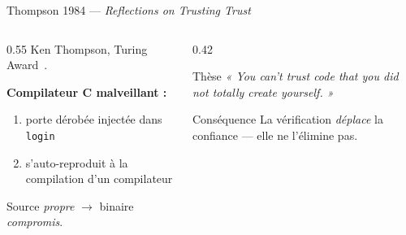\documentclass[aspectratio=169]{beamer}
\begin{document}
\begin{frame}{Thompson 1984 — \emph{Reflections on Trusting Trust}}
  \begin{columns}
    \begin{column}{0.55\textwidth}
      Ken Thompson, Turing Award~\cite{thompson1984trusting}.
      \medskip

      \textbf{Compilateur C malveillant :}
      \begin{enumerate}
        \item porte dérobée injectée dans \texttt{login}
        \item s'auto-reproduit à la compilation d'un compilateur
      \end{enumerate}
      \medskip

      Source \emph{propre} $\to$ binaire \emph{compromis}.
    \end{column}
    \begin{column}{0.42\textwidth}
      \begin{block}{Thèse}
        \emph{« You can't trust code that you did not totally create yourself. »}
      \end{block}
      \medskip
      \begin{alertblock}{Conséquence}
        La vérification \emph{déplace} la confiance — elle ne l'élimine pas.
      \end{alertblock}
    \end{column}
  \end{columns}
\end{frame}
\end{document}
